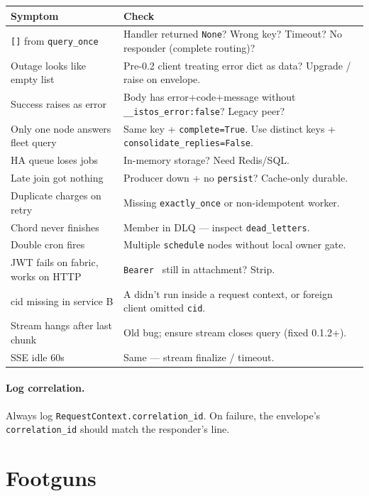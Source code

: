 \documentclass[11pt,a4paper]{article}
\begin{document}
\begin{tabularx}{\textwidth}{@{}>{\raggedright\arraybackslash}p{}X@{}}
\toprule
\textbf{Symptom} & \textbf{Check} \\
\midrule
\texttt{[]} from \texttt{query\_once} & Handler returned \texttt{None}? Wrong key?
Timeout? No responder (complete routing)? \\
Outage looks like empty list & Pre-0.2 client treating error dict as data?
Upgrade / raise on envelope. \\
Success raises as error & Body has error+code+message without
\texttt{\_\_istos\_error:false}? Legacy peer? \\
Only one node answers fleet query & Same key + \texttt{complete=True}. Use distinct
keys + \texttt{consolidate\_replies=False}. \\
HA queue loses jobs & In-memory storage? Need Redis/SQL. \\
Late join got nothing & Producer down + no \texttt{persist}? Cache-only durable. \\
Duplicate charges on retry & Missing \texttt{exactly\_once} or non-idempotent worker. \\
Chord never finishes & Member in DLQ --- inspect \texttt{dead\_letters}. \\
Double cron fires & Multiple \texttt{schedule} nodes without local owner gate. \\
JWT fails on fabric, works on HTTP & \texttt{Bearer } still in attachment? Strip. \\
cid missing in service B & A didn't run inside a request context, or foreign
client omitted \texttt{cid}. \\
Stream hangs after last chunk & Old bug; ensure stream closes query (fixed 0.1.2+). \\
SSE idle 60s & Same --- stream finalize / timeout. \\
\bottomrule
\end{tabularx}

\paragraph{Log correlation.}
Always log \texttt{RequestContext.correlation\_id}. On failure, the envelope's
\texttt{correlation\_id} should match the responder's line.

\section{Footguns}
\label{sec:footguns}
\end{document}
